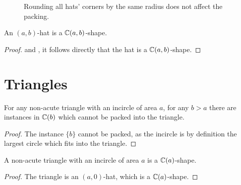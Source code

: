 \documentclass[%
    a4paper,              %
    style=screen,          %
    bibliography=totoc,   %
    nexus,                %
    lnum,                 %
    extramargin,          %
]{tubsbook}
\newcommand\defaulta{30}
\newcommand\defaultb{40}
\newcommand\defaultr{0.2}
\newcommand\defaultx{0.6}
\begin{document}
\begin{figure}[htbp!]
    \centering


    \caption{Rounding all hats' corners by the same radius does not affect the packing.}
    \label{fig:rounding-hats}
\end{figure}

\begin{theorem}
    An $(a,b)$-hat is a $\mathbb{C}(a,b)$-shape.
\end{theorem}

\begin{proof}
     and , it follows directly that the hat is a $\mathbb{C}(a,b)$-shape.
\end{proof}

\chapter{Triangles}

\begin{theorem}
    For any non-acute triangle with an incircle of area $a$, for any $b > a$ there are instances in $\mathbb{C}(b)$ which cannot be packed into the triangle.
\end{theorem}

\begin{proof}
    The instance $\{b\}$ cannot be packed, as the incircle is by definition the largest circle which fits into the triangle.
\end{proof}

\begin{theorem}
    A non-acute triangle with an incircle of area $a$ is a $\mathbb{C}(a)$-shape.
\end{theorem}

\begin{proof}
    The triangle is an $(a,0)$-hat, which is a $\mathbb{C}(a)$-shape.
\end{proof}
\end{document}
